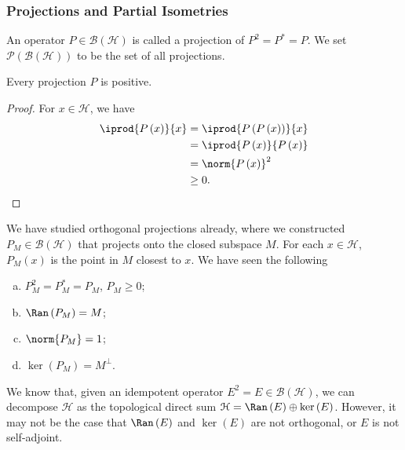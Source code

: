 \documentclass[10pt]{mypackage}
\begin{document}
\subsubsection{Projections and Partial Isometries}%
An operator $P\in \mathcal{B}\left(\mathcal{H}\right)$ is called a projection of $P^2 = P^{\ast} = P$. We set $\mathcal{P}\left(\mathcal{B}\left(\mathcal{H}\right)\right)$ to be the set of all projections.
\begin{fact}
  Every projection $P$ is positive.
\end{fact}
\begin{proof}
  For $x\in \mathcal{H}$, we have
  \begin{align*}
    \iprod{P\left(x\right)}{x} &= \iprod{P\left(P\left(x\right)\right)}{x}\\
                               &= \iprod{P\left(x\right)}{P\left(x\right)}\\
                               &= \norm{P\left(x\right)}^2\\
                               &\geq 0.
  \end{align*}
\end{proof}
We have studied orthogonal projections already, where we constructed $P_M\in \mathcal{B}\left(\mathcal{H}\right)$ that projects onto the closed subspace $M$. For each $x\in \mathcal{H}$, $P_M\left(x\right)$ is the point in $M$ closest to $x$. We have seen the following
\begin{enumerate}[(a)]
  \item $P_M^2 = P_M^{\ast} = P_M$, $P_M \geq 0$;
  \item $\Ran\left(P_M\right) = M$;
  \item $\norm{P_M} = 1$;
  \item $\ker\left(P_M\right) = M^{\perp}$.
\end{enumerate}
We know that, given an idempotent operator $E^2 = E \in \mathcal{B}\left(\mathcal{H}\right)$, we can decompose $\mathcal{H}$ as the topological direct sum $\mathcal{H} = \Ran\left(E\right) \oplus \ker\left(E\right)$. However, it may not be the case that $\Ran\left(E\right)$ and $\ker\left(E\right)$ are not orthogonal, or $E$ is not self-adjoint.\newline
\end{document}
